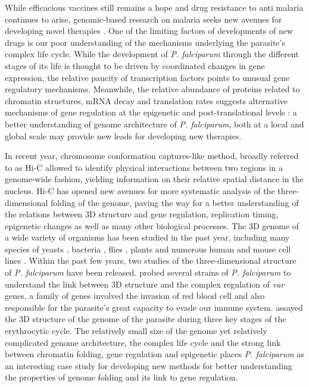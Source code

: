 \documentclass[letterpaper,12pt]{article}
\begin{document}
While efficacious vaccines still remains a hope and drug resistance to anti
malaria continues to arise, genomic-based research on malaria seeks new
avenues for developing novel therapies \citep{kirchner:recent}. One of the
limiting factors of developments of new drugs is our poor understanding of the
mechanisms underlying the parasite's complex life cycle. While the development
of {\em P. falciparum} through the different stages of its life is thought to
be driven by coordinated changes in gene expression, the relative paucity of
transcription factors points to unusual gene regulatory mechanisms. Meanwhile,
the relative abundance of proteins related to chromatin structures, mRNA decay
and translation rates suggests alternative mechanisms of gene regulation at
the epigenetic and post-translational levels \citep{cui:chromatin-mediated,
duffy:role, hoeijmakers:placing, horrocks:control, deitsch:mechanisms}:
a better understanding of genome architecture of {\em P. falciparum}, both at
a local and global scale may provide new leads for developing new therapies.

In recent year, chromosome conformation captures-like method, broadly referred
to as Hi-C allowed to identify physical interactions between two regions in a
genome-wide fashion, yielding information on their relative spatial distance
in the nucleus. Hi-C has opened new avenues for more systematic analysis of
the three-dimensional folding of the genome, paving the way for a better
understanding of the relations between 3D structure and gene regulation,
replication timing, epigenetic changes as well as many other biological
processes. The 3D genome of a wide variety of organisms has been studied in
the past year, including many species of yeasts \citep{duan:three-dimensional,
burton:species-level, mizuguchi:cohesin-dependent}, bacteria
\citep{umbarger:three-dimensional}, flies \citep{sexton:three-dimensional},
plants \citep{feng:genome-wide, wang:genome-wide} and numerous human and mouse
cell lines \citep{lieberman-aiden:comprehensive, rao:3D}. Within the past few
years, two studies of the three-dimensional structure of {\em P. falciparum}
have been released.  \citet{lemieux:genome-wide} probed several strains of
{\em P. falciparum} to understand the link between 3D structure and the
complex regulation of \textit{var} genes, a family of genes involved the
invasion of red blood cell and also responsible for the parasite's great
capacity to evade our immune system. \citet{ay:three-dimensional} assayed the
3D structure of the genome of the parasite during three key stages of the
erythrocytic cycle. The relatively small size of the genome yet relatively
complicated genome architecture, the complex life cycle and the strong link
between chromatin folding, gene regulation and epigenetic places {\em P.
falciparum} as an interesting case study for developing new methods for better
understanding the properties of genome folding and its link to gene
regulation.
\end{document}

